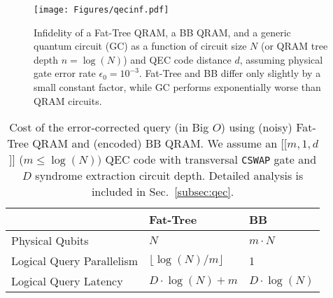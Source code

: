 \begin{figure}[t]
         \centering
         \texttt{[image: Figures/qecinf.pdf]}
         \caption{Infidelity of a Fat-Tree QRAM, a BB QRAM, and a generic quantum circuit (GC) as a function of circuit size $N$ (or QRAM tree depth $n=\log(N)$) and QEC code distance $d$, assuming physical gate error rate $\epsilon_0=10^{-3}$. Fat-Tree and BB differ only slightly by a small constant factor, while GC performs exponentially worse than QRAM circuits.}
         \label{fig:qecinf}
\end{figure}

\begin{table}[t]
\small
\centering
\begin{tabular}{ p{3.5cm}||p{2cm}|p{1.5cm}}
\hline
 & Fat-Tree &  BB \\ \hline
Physical Qubits & $N$ & $m\cdot N$ \\ \hline
Logical Query Parallelism & $\lfloor \log(N)/m \rfloor$ & 1 \\ \hline
Logical Query Latency & $D\cdot \log(N) + m$ & $D\cdot \log(N)$ \\ \hline
\end{tabular}
\caption{Cost of the error-corrected query (in Big $O$) using (noisy) Fat-Tree QRAM and (encoded) BB QRAM.  We assume an [[$m,1,d$]] ($m\leq\log(N))$ QEC code with transversal \texttt{CSWAP} gate and $D$ syndrome extraction circuit depth. Detailed analysis is included in Sec.~\ref{subsec:qec}. }
\label{tab:qecestimation}
\end{table}

